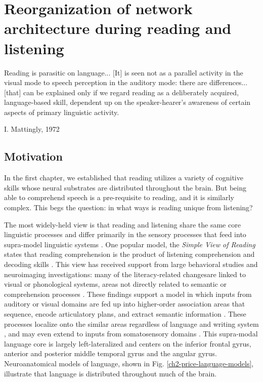 \chapter{Reorganization of network architecture during reading and listening}

\epigraph{Reading is parasitic on language... [It] is seen not as a parallel activity in the visual mode to speech perception in the auditory mode: there are differences... [that] can be explained only if we regard reading as a deliberately acquired, language-based skill, dependent up on the speaker-hearer's awareness of certain aspects of primary linguistic activity.}{I. Mattingly, 1972 \citep{Mattingly1972}}

\section{Motivation}

In the first chapter, we established that reading utilizes a variety of cognitive skills whose neural substrates are distributed throughout the brain. But being able to comprehend speech is a pre-requisite to reading, and it is similarly complex. This begs the question: in what ways is reading unique from listening?

The most widely-held view is that reading and listening share the same core linguistic processes and differ primarily in the sensory processes that feed into supra-model linguistic systems \citep{Mattingly1972, Price2012}. One popular model, the \textit{Simple View of Reading} states that reading comprehension is the product of listening comprehension and decoding skills \citep{Gough1988}. This view has received support from large behavioral studies \citep{Kirby2006} and neuroimaging investigations: many of the literacy-related changesare linked to visual or phonological systems, areas not directly related to semantic or comprehension processes \citep{Schlaggar2006, Dahaene2015}. These findings support a model in which inputs from auditory or visual domains are fed up into higher-order association areas that sequence, encode articulatory plans, and extract semantic information \citep{Price2012}. These processes localize onto the similar areas regardless of language and writing system \citep{Rueckl2016}, and may even extend to inputs from somatosensory domains \citep{Xu2005, Sood2015}. This supra-modal language core is largely left-lateralized and centers on the inferior frontal gyrus, anterior and posterior middle temporal gyrus and the angular gyrus. Neuroanatomical models of language, shown in Fig. \ref{ch2-price-language-models}, illustrate that language is distributed throughout much of the brain. 

